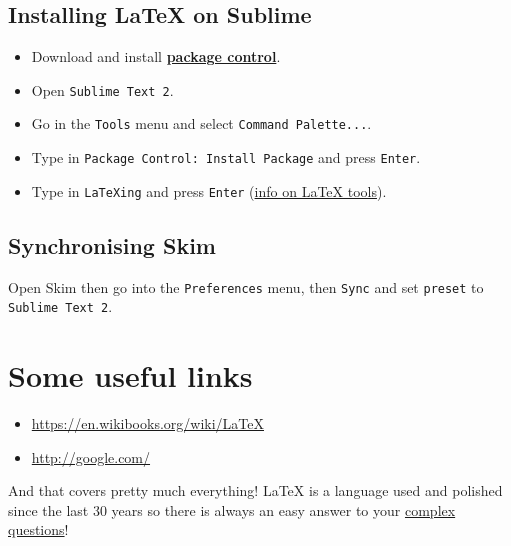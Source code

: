 \documentclass[a4paper,11pt]{article}
\begin{document}
\subsection{Installing LaTeX on Sublime}
\begin{itemize}
\item Download and install \href{https://packagecontrol.io/}{\textbf{package control}}. %
\item Open \texttt{Sublime Text 2}.
\item Go in the \texttt{Tools} menu and select \texttt{Command Palette...}.
\item Type in \texttt{Package Control: Install Package} and press \texttt{Enter}.
\item Type in \texttt{LaTeXing} %
and press \texttt{Enter} (\href{https://github.com/SublimeText/LaTeXTools/blob/master/README.markdown}{info on LaTeX tools}).
\end{itemize}

\subsection{Synchronising Skim}
Open Skim then go into the \texttt{Preferences} menu, then \texttt{Sync} and set \texttt{preset} to \texttt{Sublime Text 2}.

\section{Some useful links}
\begin{itemize}
\item \url{https://en.wikibooks.org/wiki/LaTeX}
\item \url{http://google.com/}
\end{itemize}
And that covers pretty much everything!
LaTeX is a language used and polished since the last 30 years so there is always an easy answer to your \href{http://lmgtfy.com/?q=How+to+make+a+macro+for+a+table+environment+in+latex}{complex questions}!
\end{document}
